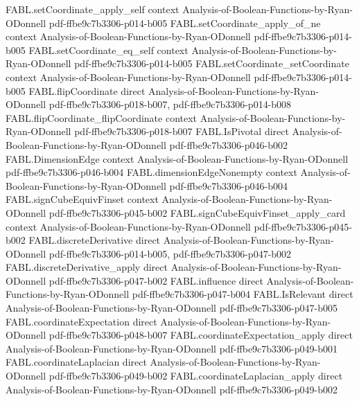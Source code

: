 \begin{theorem}
\proofstep
  {FABL.setCoordinate_apply_self}
  {context}
  {Analysis-of-Boolean-Functions-by-Ryan-ODonnell}
  {pdf-ffbe9c7b3306-p014-b005}
\proofstep
  {FABL.setCoordinate_apply_of_ne}
  {context}
  {Analysis-of-Boolean-Functions-by-Ryan-ODonnell}
  {pdf-ffbe9c7b3306-p014-b005}
\proofstep
  {FABL.setCoordinate_eq_self}
  {context}
  {Analysis-of-Boolean-Functions-by-Ryan-ODonnell}
  {pdf-ffbe9c7b3306-p014-b005}
\proofstep
  {FABL.setCoordinate_setCoordinate}
  {context}
  {Analysis-of-Boolean-Functions-by-Ryan-ODonnell}
  {pdf-ffbe9c7b3306-p014-b005}
\proofstep
  {FABL.flipCoordinate}
  {direct}
  {Analysis-of-Boolean-Functions-by-Ryan-ODonnell}
  {pdf-ffbe9c7b3306-p018-b007,
    pdf-ffbe9c7b3306-p014-b008}
\proofstep
  {FABL.flipCoordinate_flipCoordinate}
  {context}
  {Analysis-of-Boolean-Functions-by-Ryan-ODonnell}
  {pdf-ffbe9c7b3306-p018-b007}
\proofstep
  {FABL.IsPivotal}
  {direct}
  {Analysis-of-Boolean-Functions-by-Ryan-ODonnell}
  {pdf-ffbe9c7b3306-p046-b002}
\proofstep
  {FABL.DimensionEdge}
  {context}
  {Analysis-of-Boolean-Functions-by-Ryan-ODonnell}
  {pdf-ffbe9c7b3306-p046-b004}
\proofstep
  {FABL.dimensionEdgeNonempty}
  {context}
  {Analysis-of-Boolean-Functions-by-Ryan-ODonnell}
  {pdf-ffbe9c7b3306-p046-b004}
\proofstep
  {FABL.signCubeEquivFinset}
  {context}
  {Analysis-of-Boolean-Functions-by-Ryan-ODonnell}
  {pdf-ffbe9c7b3306-p045-b002}
\proofstep
  {FABL.signCubeEquivFinset_apply_card}
  {context}
  {Analysis-of-Boolean-Functions-by-Ryan-ODonnell}
  {pdf-ffbe9c7b3306-p045-b002}
\proofstep
  {FABL.discreteDerivative}
  {direct}
  {Analysis-of-Boolean-Functions-by-Ryan-ODonnell}
  {pdf-ffbe9c7b3306-p014-b005,
    pdf-ffbe9c7b3306-p047-b002}
\proofstep
  {FABL.discreteDerivative_apply}
  {direct}
  {Analysis-of-Boolean-Functions-by-Ryan-ODonnell}
  {pdf-ffbe9c7b3306-p047-b002}
\proofstep
  {FABL.influence}
  {direct}
  {Analysis-of-Boolean-Functions-by-Ryan-ODonnell}
  {pdf-ffbe9c7b3306-p047-b004}
\proofstep
  {FABL.IsRelevant}
  {direct}
  {Analysis-of-Boolean-Functions-by-Ryan-ODonnell}
  {pdf-ffbe9c7b3306-p047-b005}
\proofstep
  {FABL.coordinateExpectation}
  {direct}
  {Analysis-of-Boolean-Functions-by-Ryan-ODonnell}
  {pdf-ffbe9c7b3306-p048-b007}
\proofstep
  {FABL.coordinateExpectation_apply}
  {direct}
  {Analysis-of-Boolean-Functions-by-Ryan-ODonnell}
  {pdf-ffbe9c7b3306-p049-b001}
\proofstep
  {FABL.coordinateLaplacian}
  {direct}
  {Analysis-of-Boolean-Functions-by-Ryan-ODonnell}
  {pdf-ffbe9c7b3306-p049-b002}
\proofstep
  {FABL.coordinateLaplacian_apply}
  {direct}
  {Analysis-of-Boolean-Functions-by-Ryan-ODonnell}
  {pdf-ffbe9c7b3306-p049-b002}

\end{theorem}
